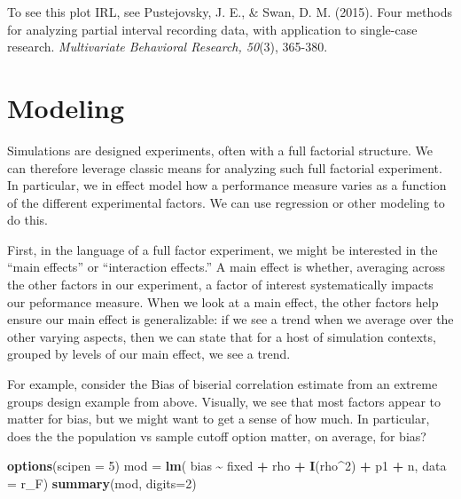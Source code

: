 \documentclass[
]{book}
\newenvironment{Shaded}{\begin{snugshade}}{\end{snugshade}}
\newcommand{\AttributeTok}[1]{\textcolor[rgb]{0.13,0.29,0.53}{#1}}
\newcommand{\DecValTok}[1]{\textcolor[rgb]{0.00,0.00,0.81}{#1}}
\newcommand{\FunctionTok}[1]{\textcolor[rgb]{0.13,0.29,0.53}{\textbf{#1}}}
\newcommand{\NormalTok}[1]{#1}
\newcommand{\OtherTok}[1]{\textcolor[rgb]{0.56,0.35,0.01}{#1}}
\newcommand{\SpecialCharTok}[1]{\textcolor[rgb]{0.81,0.36,0.00}{\textbf{#1}}}
\begin{document}
To see this plot IRL, see Pustejovsky, J. E., \& Swan, D. M. (2015). Four methods for analyzing partial interval recording data, with application to single-case research. \emph{Multivariate Behavioral Research, 50}(3), 365-380.

\section{Modeling}\label{modeling}

Simulations are designed experiments, often with a full factorial structure.
We can therefore leverage classic means for analyzing such full factorial experiment.
In particular, we in effect model how a performance measure varies as a function of the different experimental factors.
We can use regression or other modeling to do this.

First, in the language of a full factor experiment, we might be interested in the ``main effects'' or ``interaction effects.''
A main effect is whether, averaging across the other factors in our experiment, a factor of interest systematically impacts our peformance measure.
When we look at a main effect, the other factors help ensure our main effect is generalizable: if we see a trend when we average over the other varying aspects, then we can state that for a host of simulation contexts, grouped by levels of our main effect, we see a trend.

For example, consider the Bias of biserial correlation estimate from an extreme groups design example from above.
Visually, we see that most factors appear to matter for bias, but we might want to get a sense of how much.
In particular, does the the population vs sample cutoff option matter, on average, for bias?

\begin{Shaded}
\begin{Highlighting}[]
\FunctionTok{options}\NormalTok{(}\AttributeTok{scipen =} \DecValTok{5}\NormalTok{)}
\NormalTok{mod }\OtherTok{=} \FunctionTok{lm}\NormalTok{( bias }\SpecialCharTok{\textasciitilde{}}\NormalTok{ fixed }\SpecialCharTok{+}\NormalTok{ rho }\SpecialCharTok{+} \FunctionTok{I}\NormalTok{(rho}\SpecialCharTok{\^{}}\DecValTok{2}\NormalTok{) }\SpecialCharTok{+}\NormalTok{ p1 }\SpecialCharTok{+}\NormalTok{ n, }\AttributeTok{data =}\NormalTok{ r\_F)}
\FunctionTok{summary}\NormalTok{(mod, }\AttributeTok{digits=}\DecValTok{2}\NormalTok{)}
\end{Highlighting}
\end{Shaded}
\end{document}
